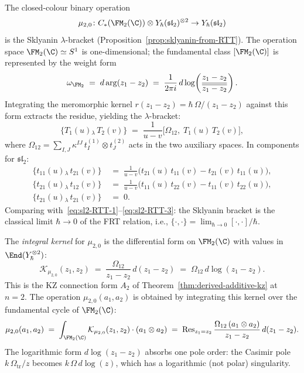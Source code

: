 \begin{computation}
\label{comp:mu20-sklyanin}
The closed-colour binary operation
\[
\mu_{2,0} \colon C_*(\FM_2(\C)) \otimes
Y_\hbar(\mathfrak{sl}_2)^{\otimes 2} \to
Y_\hbar(\mathfrak{sl}_2)
\]
is the Sklyanin $\lambda$-bracket
(Proposition~\ref{prop:sklyanin-from-RTT}).
The operation space $\FM_2(\C) \simeq S^1$ is
one-dimensional; the fundamental class
$[\FM_2(\C)]$ is represented by the weight form
\begin{equation}\label{eq:omega-FM2}
\omega_{\FM_2}
\;=\;
d\arg(z_1 - z_2)
\;=\;
\frac{1}{2\pi i}
\,d\log\!\left(\frac{z_1 - z_2}{\overline{z_1 - z_2}}\right).
\end{equation}
Integrating the meromorphic kernel
$r(z_1 - z_2) = \hbar\,\Omega/(z_1 - z_2)$ against this form
extracts the residue, yielding the $\lambda$-bracket:
\begin{equation}\label{eq:sklyanin-explicit-sl2}
\boxed{
\{T_1(u) {}_\lambda\, T_2(v)\}
\;=\;
\frac{1}{u - v}\bigl[
 \Omega_{12},\;
 T_1(u)\,T_2(v)
\bigr],
}
\end{equation}
where $\Omega_{12} = \sum_{I,J}\kappa^{IJ}\,
t_I^{(1)} \otimes t_J^{(2)}$ acts in the two auxiliary spaces.
In components for $\mathfrak{sl}_2$:
\begin{align}
\{t_{11}(u) {}_\lambda\, t_{21}(v)\}
&\;=\;
\frac{1}{u - v}\bigl(
 t_{21}(u)\,t_{11}(v) - t_{21}(v)\,t_{11}(u)
\bigr),
\label{eq:sklyanin-comp-1}
\\[3pt]
\{t_{21}(u) {}_\lambda\, t_{12}(v)\}
&\;=\;
\frac{1}{u - v}\bigl(
 t_{11}(u)\,t_{22}(v) - t_{11}(v)\,t_{22}(u)
\bigr),
\label{eq:sklyanin-comp-2}
\\[3pt]
\{t_{21}(u) {}_\lambda\, t_{21}(v)\}
&\;=\; 0.
\label{eq:sklyanin-comp-3}
\end{align}
Comparing
with~\eqref{eq:sl2-RTT-1}--\eqref{eq:sl2-RTT-3}: the Sklyanin bracket
is the classical limit $\hbar \to 0$ of the FRT relation, i.e.,
$\{\cdot, \cdot\} = \lim_{\hbar \to 0}
[\cdot, \cdot]/\hbar$.

The \emph{integral kernel} for $\mu_{2,0}$ is the differential
form on $\FM_2(\C)$ with values in
$\End(Y_\hbar^{\otimes 2})$:
\begin{equation}\label{eq:mu20-kernel}
\mathcal{K}_{\mu_{2,0}}(z_1, z_2)
\;=\;
\frac{\Omega_{12}}{z_1 - z_2}\,d(z_1 - z_2)
\;=\;
\Omega_{12}\,d\log(z_1 - z_2).
\end{equation}
This is the KZ connection form $A_2$ of
Theorem~\ref{thm:derived-additive-kz} at $n = 2$.
The operation $\mu_{2,0}(a_1, a_2)$ is obtained by integrating
this kernel over the fundamental cycle of $\FM_2(\C)$:
\[
\mu_{2,0}(a_1, a_2)
\;=\;
\int_{\FM_2(\C)}
 \mathcal{K}_{\mu_{2,0}}(z_1, z_2)
 \cdot (a_1 \otimes a_2)
\;=\;
\operatorname{Res}_{z_1 = z_2}
\frac{\Omega_{12}\,(a_1 \otimes a_2)}{z_1 - z_2}\,
d(z_1 - z_2).
\]
The logarithmic form $d\log(z_1 - z_2)$ absorbs one
pole order: the Casimir pole $k\,\Omega_{\mathrm{tr}}/z$ becomes
$k\,\Omega\,d\log(z)$, which has a logarithmic (not polar)
singularity.
\end{computation}

